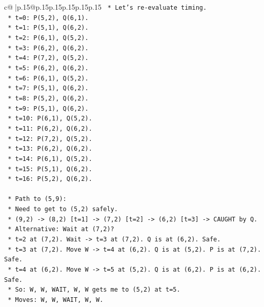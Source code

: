 \documentclass{article}
\begin{document}
{\begin{supertabular}{c@{$\;$}|p{.15\linewidth}@{}p{.15\linewidth}p{.15\linewidth}p{.15\linewidth}p{.15\linewidth}p{.15\linewidth}}
{{{\texttt{        *   Let's re{-}evaluate timing.} \\
\texttt{        *   t=0: P(5,2), Q(6,1).} \\
\texttt{        *   t=1: P(5,1), Q(6,2).} \\
\texttt{        *   t=2: P(6,1), Q(5,2).} \\
\texttt{        *   t=3: P(6,2), Q(6,2).} \\
\texttt{        *   t=4: P(7,2), Q(5,2).} \\
\texttt{        *   t=5: P(6,2), Q(6,2).} \\
\texttt{        *   t=6: P(6,1), Q(5,2).} \\
\texttt{        *   t=7: P(5,1), Q(6,2).} \\
\texttt{        *   t=8: P(5,2), Q(6,2).} \\
\texttt{        *   t=9: P(5,1), Q(6,2).} \\
\texttt{        *   t=10: P(6,1), Q(5,2).} \\
\texttt{        *   t=11: P(6,2), Q(6,2).} \\
\texttt{        *   t=12: P(7,2), Q(5,2).} \\
\texttt{        *   t=13: P(6,2), Q(6,2).} \\
\texttt{        *   t=14: P(6,1), Q(5,2).} \\
\texttt{        *   t=15: P(5,1), Q(6,2).} \\
\texttt{        *   t=16: P(5,2), Q(6,2).} \\
\\ 
\texttt{    *   Path to (5,9):} \\
\texttt{        *   Need to get to (5,2) safely.} \\
\texttt{        *   (9,2) {-}> (8,2) {[}t=1{]} {-}> (7,2) {[}t=2{]} {-}> (6,2) {[}t=3{]} {-}> CAUGHT by Q.} \\
\texttt{        *   Alternative: Wait at (7,2)?} \\
\texttt{            *   t=2 at (7,2). Wait {-}> t=3 at (7,2). Q is at (6,2). Safe.} \\
\texttt{            *   t=3 at (7,2). Move W {-}> t=4 at (6,2). Q is at (5,2). P is at (7,2). Safe.} \\
\texttt{            *   t=4 at (6,2). Move W {-}> t=5 at (5,2). Q is at (6,2). P is at (6,2). Safe.} \\
\texttt{            *   So: W, W, WAIT, W, W gets me to (5,2) at t=5.} \\
\texttt{            *   Moves: W, W, WAIT, W, W.} \\
}}}
\end{supertabular}}
\end{document}
